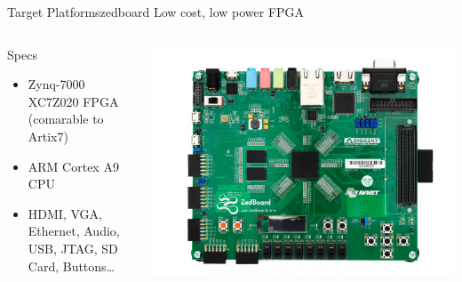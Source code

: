 \begin{frame}{Target Platforms}{zedboard}
    Low cost, low power FPGA
    \begin{columns}[T]
      \begin{column}{.5\textwidth}
       \begin{block}{Specs}
      \begin{itemize}
        \item Zynq-7000 XC7Z020 FPGA (comarable to Artix7)
        \item ARM Cortex A9 CPU
        \item HDMI, VGA, Ethernet, Audio, USB, JTAG, SD Card, Buttons\ldots
      \end{itemize}
      \end{block}
      \end{column}
      \begin{column}{.45\textwidth}
        \includegraphics[width=\textwidth]{data/zedboard.png}
      \end{column}
    \end{columns}
\end{frame}


